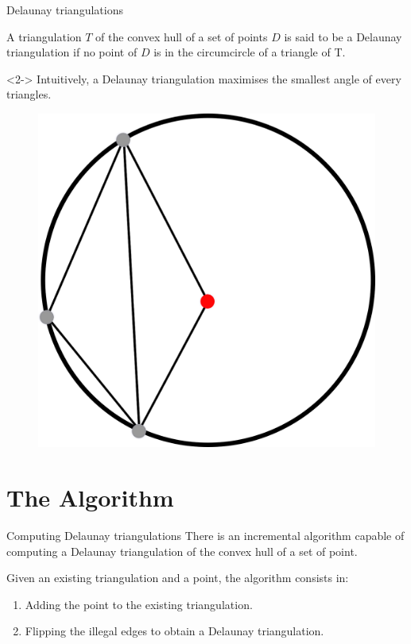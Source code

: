 \documentclass[18pt]{beamer}
\begin{document}
\begin{frame}{Delaunay triangulations}
 
 \begin{definition}
  A triangulation $T$ of the convex hull of a set of points $D$ is said to be a Delaunay triangulation if no point of $D$ is in the circumcircle of a triangle of T.
 \end{definition}
 \begin{uncoverenv}<2->
Intuitively, a Delaunay triangulation maximises the smallest angle of every triangles.
\end{uncoverenv}
 \begin{figure}
\centering
\includegraphics[scale=0.8]{dessin2}
\end{figure}
\end{frame}




\section{The Algorithm}

\begin{frame}{Computing Delaunay triangulations}
There is an incremental algorithm capable of computing a Delaunay triangulation of the convex hull of a set of point.

Given an existing triangulation and a point, the algorithm consists in:
\begin{enumerate}
\item<1-> Adding the point to the existing triangulation.
\item<2-> Flipping the illegal edges to obtain a Delaunay triangulation.
\end{enumerate}
\end{frame}
\end{document}

